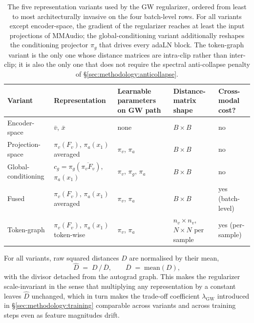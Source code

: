 \begin{table}[t]
  \centering
  \small
  \begin{tabular}{@{}lllll@{}}
    \toprule
    Variant & Representation & Learnable parameters on GW path & Distance-matrix shape & Cross-modal cost? \\
    \midrule
    Encoder-space        & $\bar v$, $\bar x$                                 & none                             & $B \times B$                              & no  \\
    Projection-space     & $\pi_v(F_v)$, $\pi_a(x_1)$ averaged                & $\pi_v$, $\pi_a$                 & $B \times B$                              & no  \\
    Global-conditioning  & $c_g = \pi_g(\overline{\pi_v F_v})$, $\pi_a(x_1)$  & $\pi_v$, $\pi_g$, $\pi_a$        & $B \times B$                              & no  \\
    Fused                & $\pi_v(F_v)$, $\pi_a(x_1)$ averaged                & $\pi_v$, $\pi_a$                 & $B \times B$                              & yes (batch-level) \\
    Token-graph          & $\pi_v(F_v)$, $\pi_a(x_1)$ token-wise              & $\pi_v$, $\pi_a$                 & $n_v \times n_v$, $N \times N$ per sample & yes (per-sample) \\
    \bottomrule
  \end{tabular}
  \caption{The five representation variants used by the GW
    regularizer, ordered from least to most architecturally
    invasive on the four batch-level rows. For all variants
    except encoder-space, the gradient of the regularizer reaches
    at least the input projections of MMAudio; the
    global-conditioning variant additionally reshapes the
    conditioning projector $\pi_g$ that drives every adaLN block.
    The token-graph variant is the only one whose distance
    matrices are intra-clip rather than inter-clip; it is also
    the only one that does not require the spectral
    anti-collapse penalty of
    \S\ref{sec:methodology:anticollapse}.}
  \label{tab:variants}
\end{table}

For all variants, raw squared distances $D$ are normalised by
their mean,
\begin{equation}
  \widehat D \;=\; D \,/\, \overline{D},
  \qquad
  \overline{D} \;=\; \mathrm{mean}(D),
  \label{eq:dist_normalisation}
\end{equation}
with the divisor detached from the autograd graph. This makes the
regularizer scale-invariant in the sense that multiplying any
representation by a constant leaves $\widehat D$ unchanged, which in
turn makes the trade-off coefficient $\lambda_{\mathrm{GW}}$
introduced in \S\ref{sec:methodology:training} comparable across
variants and across training steps even as feature magnitudes
drift.

